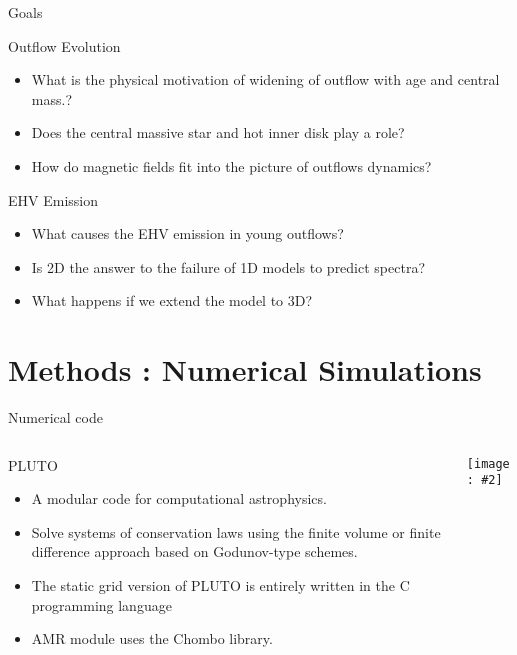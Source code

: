 \documentclass[8pt,xcolor=dvipsnames]{beamer}
\newcommand{\figpath}{./NEWFIGS/}
\newcommand{\spic}[2]{\texttt{[image: \#2]}}
\begin{document}
\begin{frame}{Goals}
\begin{block}{Outflow Evolution}
\begin{itemize}
\item <1-> What is the physical motivation of widening of outflow with age and central mass.?
\item <2-> Does the central massive star and hot inner disk play a role?  
\item <3->How do magnetic fields fit into the picture of outflows dynamics?
\end{itemize}
\end{block}

\begin{block}{EHV Emission}
\begin{itemize}
\item <4->What causes the EHV emission in young outflows?
\item <5->Is 2D the answer to the failure of 1D models to predict spectra?
\item <6->What happens if we extend the model to 3D? 
\end{itemize}
\end{block}
\end{frame}


\section{Methods : Numerical Simulations}
\begin{frame}{Numerical code}
\begin{columns}
\begin{column}{0.5\textwidth}
\begin{block}{PLUTO}
\begin{itemize}
\item A modular code for computational astrophysics.
\item Solve systems of conservation laws using the finite volume or
  finite difference approach based on Godunov-type schemes.
\item The static grid version of PLUTO is entirely written in the C programming language
\item AMR module uses the Chombo library. 
\end{itemize}
\end{block}
\end{column}
\begin{column}{0.5\textwidth}
\spic{0.26}{\figpath/Pluto_code_cover.png}
\end{column}
\end{columns}
\end{frame}
\end{document}
